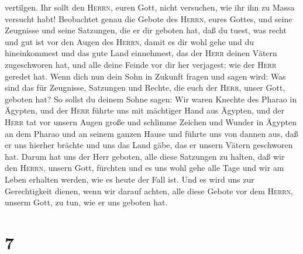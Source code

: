 vertilgen.  Ihr sollt den \textsc{Herrn}, euren Gott,
nicht versuchen, wie ihr ihn zu Massa versucht habt! 
Beobachtet genau die Gebote des \textsc{Herrn}, eures Gottes, und seine
Zeugnisse und seine Satzungen, die er dir geboten hat, 
daß du tuest, was recht und gut ist vor den Augen des \textsc{Herrn},
damit es dir wohl gehe und du hineinkommest und das gute Land
einnehmest, das der \textsc{Herr} deinen Vätern zugeschworen hat,
 und alle deine Feinde vor dir her verjagest; wie der
\textsc{Herr} geredet hat.  Wenn dich nun dein Sohn in
Zukunft fragen und sagen wird: Was sind das für Zeugnisse, Satzungen und
Rechte, die euch der \textsc{Herr}, unser Gott, geboten hat?
 So sollst du deinem Sohne sagen: Wir waren Knechte des
Pharao in Ägypten, und der \textsc{Herr} führte uns mit mächtiger Hand
aus Ägypten,  und der \textsc{Herr} tat vor unsern Augen
große und schlimme Zeichen und Wunder in Ägypten an dem Pharao und an
seinem ganzen Hause  und führte uns von dannen aus, daß
er uns hierher brächte und uns das Land gäbe, das er unsern Vätern
geschworen hat.  Darum hat uns der Herr geboten, alle
diese Satzungen zu halten, daß wir den \textsc{Herrn}, unsern Gott,
fürchten und es uns wohl gehe alle Tage und wir am Leben erhalten
werden, wie es heute der Fall ist.  Und es wird uns zur
Gerechtigkeit dienen, wenn wir darauf achten, alle diese Gebote vor dem
\textsc{Herrn}, unserm Gott, zu tun, wie er uns geboten hat.

\hypertarget{section-6}{%
\section{7}\label{section-6}}

